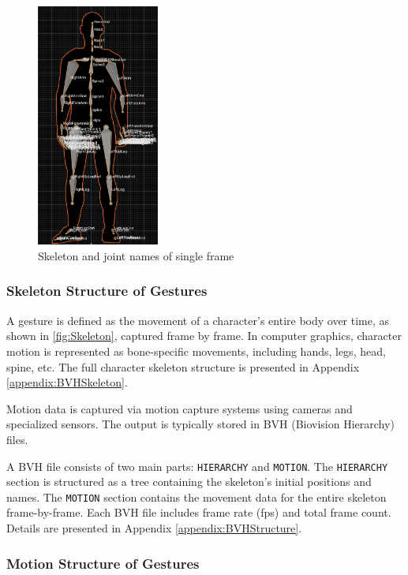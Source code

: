 \begin{figure}[h]
	\centering
	\includegraphics[height=8cm]{images/Skeleton.png}
	\caption{\small Skeleton and joint names of single frame}
	\label{fig:Skeleton}
\end{figure}

\subsubsection{Skeleton Structure of Gestures}

A gesture is defined as the movement of a character's entire body over time, as shown in \autoref{fig:Skeleton}, captured frame by frame. In computer graphics, character motion is represented as bone-specific movements, including hands, legs, head, spine, etc. The full character skeleton structure is presented in Appendix \autoref{appendix:BVHSkeleton}.

Motion data is captured via motion capture systems using cameras and specialized sensors. The output is typically stored in BVH (Biovision Hierarchy) files.

A BVH file consists of two main parts: \texttt{HIERARCHY} and \texttt{MOTION}. The \texttt{HIERARCHY} section is structured as a tree containing the skeleton’s initial positions and names. The \texttt{MOTION} section contains the movement data for the entire skeleton frame-by-frame. Each BVH file includes frame rate (fps) and total frame count. Details are presented in Appendix \autoref{appendix:BVHStructure}.

\subsubsection{Motion Structure of Gestures}

